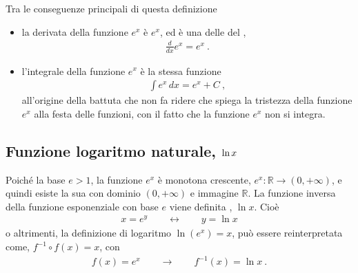 \documentclass[letterpaper,10pt,italian]{jupyterBook}
\begin{document}
\sphinxAtStartPar
Tra le conseguenze principali di questa definizione
\begin{itemize}
\item {} 
\sphinxAtStartPar
la derivata della funzione \(e^x\) è \(e^x\), ed è una delle {\hyperref[\detokenize{ch/infinitesimal_calculus/derivatives:infinitesimal-calculus-derivatives-fund}]{}} del {\hyperref[\detokenize{ch/infinitesimal_calculus/derivatives:infinitesimal-calculus-derivatives}]{}},
\begin{equation*}
\begin{split}\frac{d}{dx} e^x = e^x \ .\end{split}
\end{equation*}
\item {} 
\sphinxAtStartPar
l’integrale della funzione \(e^x\) è la stessa funzione
\begin{equation*}
\begin{split}\int e^x \, dx = e^x + C \ ,\end{split}
\end{equation*}
\sphinxAtStartPar
all’origine della battuta che non fa ridere \sphinxstylestrong{(!)} che spiega la tristezza della funzione \(e^x\) alla festa delle funzioni, con il fatto che la funzione \(e^x\) non si integra.

\end{itemize}




\subsection{Funzione logaritmo naturale, \protect\(\text{ln} \, x\protect\)}
\label{\detokenize{ch/precalculus/exponential_logarithm:funzione-logaritmo-naturale-text-ln-x}}\label{\detokenize{ch/precalculus/exponential_logarithm:math-hs-exp-def-ln}}
\sphinxAtStartPar
{} Poiché la base \(e > 1\), la funzione \(e^x\) è monotona crescente, \(e^x: \mathbb{R} \rightarrow (0, +\infty)\), e quindi esiste la sua {\hyperref[\detokenize{ch/precalculus/real-functions:math-hs-precalculus-real-functions-inverse}]{}} con dominio \((0,+\infty)\) e immagine \(\mathbb{R}\). La funzione inversa della funzione esponenziale con base \(e\) viene definita , \(\ln x\). Cioè
\begin{equation*}
\begin{split}x = e^y \qquad \leftrightarrow \qquad y = \ln x\end{split}
\end{equation*}
\sphinxAtStartPar
o altrimenti, la definizione di logaritmo \(\ln ( e^x ) = x\), può essere reinterpretata come, \(f^{-1} \circ f(x) = x \), con
\begin{equation*}
\begin{split}f(x) = e^x \qquad \rightarrow \qquad f^{-1}(x) = \ln x \ .\end{split}
\end{equation*}
\end{document}
